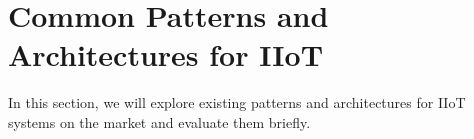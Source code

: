 \section{Common Patterns and Architectures for IIoT}
\label{section:common-patterns}

    In this section, we will explore existing patterns and architectures for IIoT systems on the market and evaluate them briefly. 

    
    
    
    
    
    